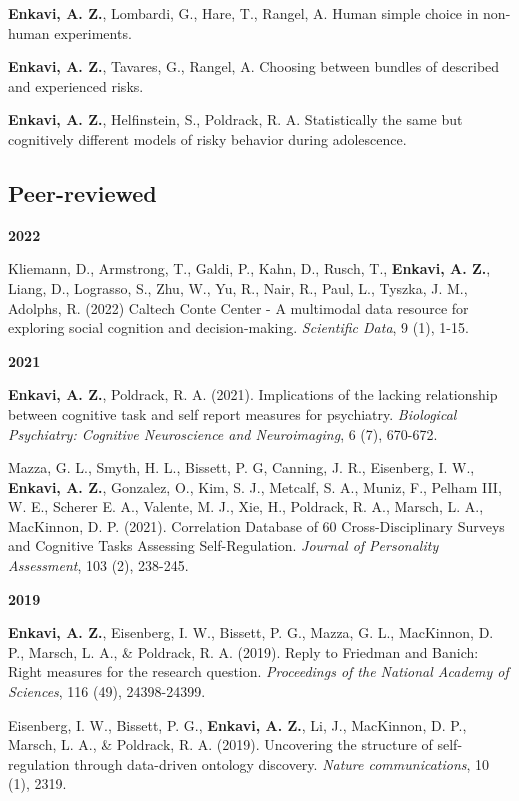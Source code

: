 \documentclass[11pt,]{article}
\begin{document}
\textbf{Enkavi, A. Z.}, Lombardi, G., Hare, T., Rangel, A. Human simple
choice in non-human experiments.

\textbf{Enkavi, A. Z.}, Tavares, G., Rangel, A. Choosing between bundles
of described and experienced risks.

\textbf{Enkavi, A. Z.}, Helfinstein, S., Poldrack, R. A. Statistically
the same but cognitively different models of risky behavior during
adolescence.

\hypertarget{peer-reviewed}{%
\subsection{Peer-reviewed}\label{peer-reviewed}}

\textbf{2022}

Kliemann, D., Armstrong, T., Galdi, P., Kahn, D., Rusch, T.,
\textbf{Enkavi, A. Z.}, Liang, D., Lograsso, S., Zhu, W., Yu, R., Nair,
R., Paul, L., Tyszka, J. M., Adolphs, R. (2022) Caltech Conte Center - A
multimodal data resource for exploring social cognition and
decision-making. \emph{Scientific Data}, 9 (1), 1-15.

\textbf{2021}

\textbf{Enkavi, A. Z.}, Poldrack, R. A. (2021). Implications of the
lacking relationship between cognitive task and self report measures for
psychiatry. \emph{Biological Psychiatry: Cognitive Neuroscience and
Neuroimaging}, 6 (7), 670-672.

Mazza, G. L., Smyth, H. L., Bissett, P. G, Canning, J. R., Eisenberg, I.
W., \textbf{Enkavi, A. Z.}, Gonzalez, O., Kim, S. J., Metcalf, S. A.,
Muniz, F., Pelham III, W. E., Scherer E. A., Valente, M. J., Xie, H.,
Poldrack, R. A., Marsch, L. A., MacKinnon, D. P. (2021). Correlation
Database of 60 Cross-Disciplinary Surveys and Cognitive Tasks Assessing
Self-Regulation. \emph{Journal of Personality Assessment}, 103 (2),
238-245.

\textbf{2019}

\textbf{Enkavi, A. Z.}, Eisenberg, I. W., Bissett, P. G., Mazza, G. L.,
MacKinnon, D. P., Marsch, L. A., \& Poldrack, R. A. (2019). Reply to
Friedman and Banich: Right measures for the research question.
\emph{Proceedings of the National Academy of Sciences}, 116 (49),
24398-24399.

Eisenberg, I. W., Bissett, P. G., \textbf{Enkavi, A. Z.}, Li, J.,
MacKinnon, D. P., Marsch, L. A., \& Poldrack, R. A. (2019). Uncovering
the structure of self-regulation through data-driven ontology discovery.
\emph{Nature communications}, 10 (1), 2319.
\end{document}
